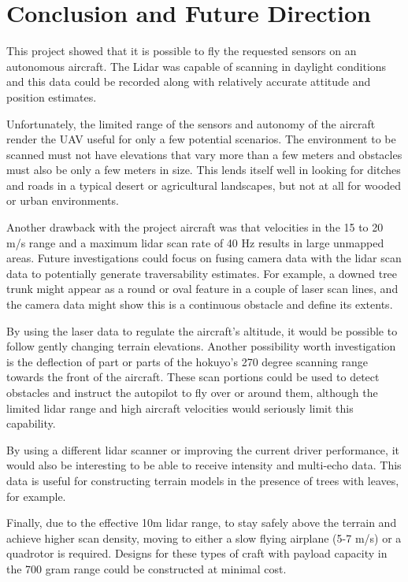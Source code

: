 \documentclass[a4paper,11pt]{report}
\begin{document}
\chapter{Conclusion and Future Direction}

This project showed that it is possible to fly the requested sensors on an autonomous aircraft. The Lidar was capable of scanning in daylight conditions and this data could be recorded along with relatively accurate attitude and position estimates.

Unfortunately, the limited range of the sensors and autonomy of the aircraft render the UAV useful for only a few potential scenarios. The environment to be scanned must not have elevations that vary more than a few meters and obstacles must also be only a few meters in size. This lends itself well in looking for ditches and roads in a typical desert or agricultural landscapes, but not at all for wooded or urban environments.

Another drawback with the project aircraft was that velocities in the 15 to 20 m/s range and a maximum lidar scan rate of 40 Hz results in large unmapped areas. Future investigations could focus on fusing camera data with the lidar scan data to potentially generate traversability estimates. For example, a downed tree trunk might appear as a round or oval feature in a couple of laser scan lines, and the camera data might show this is a continuous obstacle and define its extents.

By using the laser data to regulate the aircraft's altitude, it would be possible to follow gently changing terrain elevations. Another possibility worth investigation is the deflection of part or parts of the hokuyo's 270 degree scanning range towards the front of the aircraft. These scan portions could be used to detect obstacles and instruct the autopilot to fly over or around them, although the limited lidar range and high aircraft velocities would seriously limit this capability.

By using a different lidar scanner or improving the current driver performance, it would also be interesting to be able to receive intensity and multi-echo data. This data is useful for constructing terrain models in the presence of trees with leaves, for example.

Finally, due to the effective 10m lidar range, to stay safely above the terrain and achieve higher scan density, moving to either a slow flying airplane (5-7 m/s) or a quadrotor is required. Designs for these types of craft with payload capacity in the 700 gram range could be constructed at minimal cost.
\end{document}
